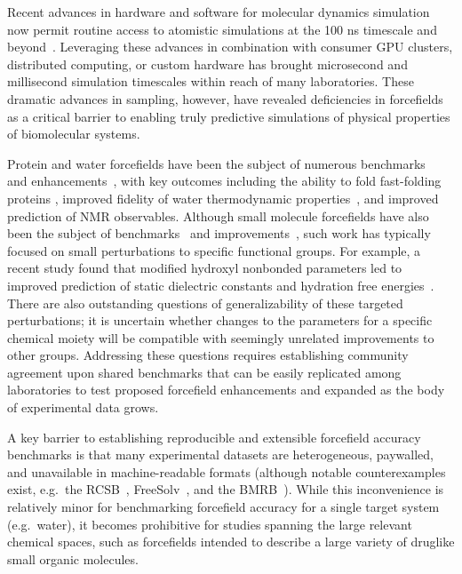 \documentclass[aps,pre,twocolumn,nofootinbib,superscriptaddress,linenumbers]{revtex4-1}
\begin{document}
Recent advances in hardware and software for molecular dynamics simulation now permit routine access to atomistic simulations at the 100 ns timescale and beyond~\cite{salomon2013routine}.
Leveraging these advances in combination with consumer GPU clusters, distributed computing, or custom hardware has brought microsecond and millisecond simulation timescales within reach of many laboratories.  
These dramatic advances in sampling, however, have revealed deficiencies in forcefields as a critical barrier to enabling truly predictive simulations of physical properties of biomolecular systems.  

Protein and water forcefields have been the subject of numerous benchmarks~\cite{lindorff2012systematic, beauchamp2012protein, best2008} and enhancements~\cite{li2011iterative, best2012optimization, Lindorff-Larsen2010}, with key outcomes including the ability to fold fast-folding proteins \cite{shaw2011, ensign2007heterogeneity, Voelz2010}, improved fidelity of water thermodynamic properties~\cite{horn2004}, and improved prediction of NMR observables.  
Although small molecule forcefields have also been the subject of benchmarks~\cite{caleman2011force} and improvements~\cite{fennell2014fixed}, such work has typically focused on small perturbations to specific functional groups.  
For example, a recent study found that modified hydroxyl nonbonded parameters led to improved prediction of static dielectric constants and hydration free energies~\cite{fennell2014fixed}.
There are also outstanding questions of generalizability of these targeted perturbations; it is uncertain whether changes to the parameters for a specific chemical moiety will be compatible with seemingly unrelated improvements to other groups.
Addressing these questions requires establishing community agreement upon shared benchmarks that can be easily replicated among laboratories to test proposed forcefield enhancements and expanded as the body of experimental data grows.

A key barrier to establishing reproducible and extensible forcefield accuracy benchmarks is that many experimental datasets are heterogeneous, paywalled, and unavailable in machine-readable formats (although notable counterexamples exist, e.g.~the RCSB~\cite{Berman2000}, FreeSolv~\cite{freesolv}, and the BMRB~\cite{Ulrich2008}).  
While this inconvenience is relatively minor for benchmarking forcefield accuracy for a single target system (e.g.~water), it becomes prohibitive for studies spanning the large relevant chemical spaces, such as forcefields intended to describe a large variety of druglike small organic molecules.  
\end{document}
